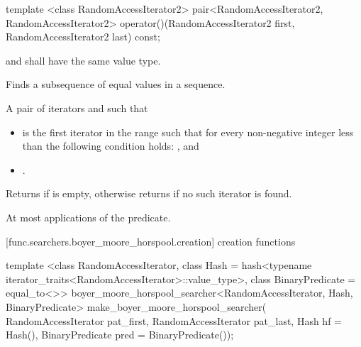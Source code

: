 %
%
\begin{itemdecl}
template <class RandomAccessIterator2>
  pair<RandomAccessIterator2, RandomAccessIterator2>
    operator()(RandomAccessIterator2 first, RandomAccessIterator2 last) const;
\end{itemdecl}

\begin{itemdescr}
\pnum
\requires
{} and  shall have the same value type.

\pnum
\effects
Finds a subsequence of equal values in a sequence.

\pnum
\returns
A pair of iterators  and  such that
\begin{itemize}
\item {} is the first iterator  in the range
 such that
for every non-negative integer  less than 
the following condition holds:
, and
\item {}.
\end{itemize}
Returns  if  is empty,
otherwise returns  if no such iterator is found.

\pnum
\complexity
At most  applications of the predicate.
\end{itemdescr}

[func.searchers.boyer_moore_horspool.creation]{ creation functions}

%
\begin{itemdecl}
template <class RandomAccessIterator,
          class Hash = hash<typename iterator_traits<RandomAccessIterator>::value_type>,
          class BinaryPredicate = equal_to<>>
  boyer_moore_horspool_searcher<RandomAccessIterator, Hash, BinaryPredicate>
    make_boyer_moore_horspool_searcher(
      RandomAccessIterator pat_first, RandomAccessIterator pat_last,
      Hash hf = Hash(), BinaryPredicate pred = BinaryPredicate());
\end{itemdecl}

